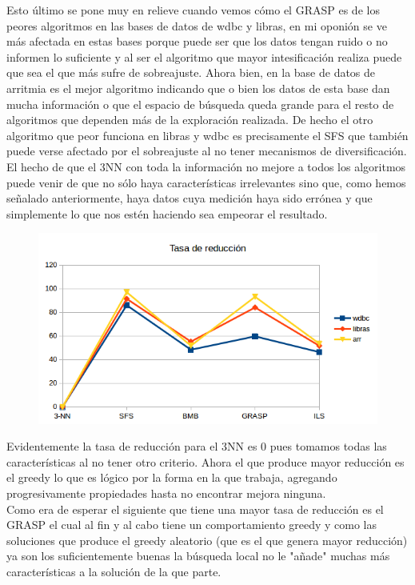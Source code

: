 \documentclass[10pt,a4paper]{article}
\begin{document}
Esto último se pone muy en relieve cuando vemos cómo el GRASP es de los peores algoritmos en las bases de datos de wdbc y libras, en mi oponión se ve más afectada en estas bases porque puede ser que los datos tengan ruido o no informen lo suficiente y al ser el algoritmo que mayor intesificación realiza puede que sea el que más sufre de sobreajuste. Ahora bien, en la base de datos de arritmia es el mejor algoritmo indicando que o bien los datos de esta base dan mucha información o que el espacio de búsqueda queda grande para el resto de algoritmos que dependen más de la exploración realizada. De hecho el otro algoritmo que peor funciona en libras y wdbc es precisamente el SFS que también puede verse afectado por el sobreajuste al no tener mecanismos de diversificación.\\

El hecho de que el 3NN con toda la información no mejore a todos los algoritmos puede venir de que no sólo haya características irrelevantes sino que, como hemos señalado anteriormente, haya datos cuya medición haya sido errónea y que simplemente lo que nos estén haciendo sea empeorar el resultado.\\

\begin{figure}[H]
\centering
\includegraphics[width=130mm]{reduccion.png}
\end{figure}

Evidentemente la tasa de reducción para el 3NN es 0 pues tomamos todas las características al no tener otro criterio. Ahora el que produce mayor reducción es el greedy lo que es lógico por la forma en la que trabaja, agregando progresivamente propiedades hasta no encontrar mejora ninguna.\\

Como era de esperar el siguiente que tiene una mayor tasa de reducción es el GRASP el cual al fin y al cabo tiene un comportamiento greedy y como las soluciones que produce el greedy aleatorio (que es el que genera mayor reducción) ya son los suficientemente buenas la búsqueda local no le "añade" muchas más características a la solución de la que parte.
\end{document}
